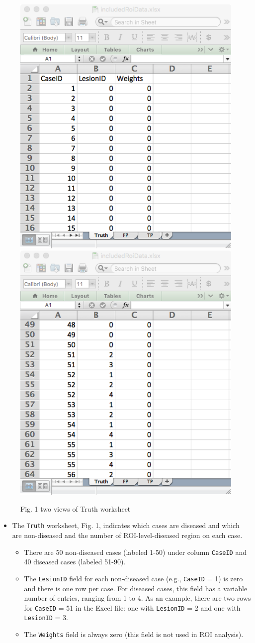 \documentclass[]{book}
\providecommand{\tightlist}{%
  \setlength{\itemsep}{0pt}\setlength{\parskip}{0pt}}
\begin{document}
\begin{figure}

{\centering \includegraphics[width=0.5\linewidth,height=0.2\textheight]{images/ROI-Truth-1} \includegraphics[width=0.5\linewidth,height=0.2\textheight]{images/ROI-Truth-2} 

}

\caption{Fig. 1 two views of Truth worksheet}\label{fig:unnamed-chunk-3}
\end{figure}

\begin{itemize}
\tightlist
\item
  The \texttt{Truth} worksheet, Fig. 1, indicates which cases are diseased and which are non-diseased and the number of ROI-level-diseased region on each case.

  \begin{itemize}
  \tightlist
  \item
    There are 50 non-diseased cases (labeled 1-50) under column \texttt{CaseID} and 40 diseased cases (labeled 51-90).\\
  \item
    The \texttt{LesionID} field for each non-diseased case (e.g., \texttt{CaseID} = 1) is zero and there is one row per case. For diseased cases, this field has a variable number of entries, ranging from 1 to 4. As an example, there are two rows for \texttt{CaseID} = 51 in the Excel file: one with \texttt{LesionID} = 2 and one with \texttt{LesionID} = 3.\\
  \item
    The \texttt{Weights} field is always zero (this field is not used in ROI analysis).
  \end{itemize}
\end{itemize}
\end{document}
